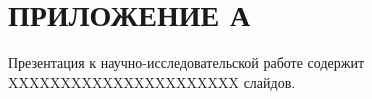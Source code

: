 \section*{ПРИЛОЖЕНИЕ А}

Презентация к научно-исследовательской работе содержит XXXXXXXXXXXXXXXXXXXXXX слайдов.
